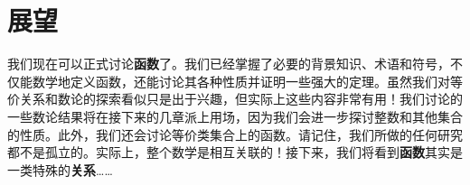 \section{展望}

我们现在可以正式讨论\textbf{函数}了。我们已经掌握了必要的背景知识、术语和符号，不仅能数学地定义函数，还能讨论其各种性质并证明一些强大的定理。虽然我们对等价关系和数论的探索看似只是出于兴趣，但实际上这些内容非常有用！我们讨论的一些数论结果将在接下来的几章派上用场，因为我们会进一步探讨整数和其他集合的性质。此外，我们还会讨论等价类集合上的函数。请记住，我们所做的任何研究都不是孤立的。实际上，整个数学是相互关联的！接下来，我们将看到\textbf{函数}其实是一类特殊的\textbf{关系}……
